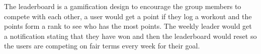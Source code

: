 The leaderboard is a gamification design to encourage the group members to compete with each other, a user would get a point if they log a workout and the points form a rank to see who has the most points. The weekly leader would get a notification stating that they have won and then the leaderboard would reset so the users are competing on fair terms every week for their goal.



